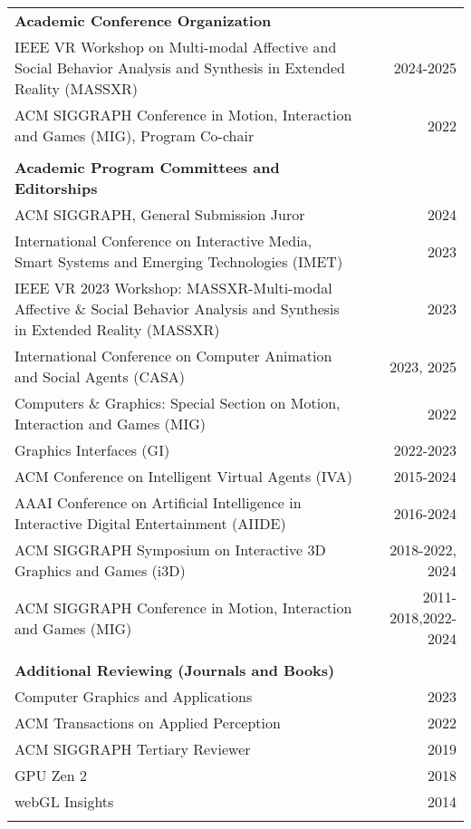 \begin{table}[h!]
\begin{tabularx}{7.1in}{@{}L@{\extracolsep\fill}r}
{\bf Academic Conference Organization } & \\
IEEE VR Workshop on Multi-modal Affective and Social Behavior Analysis and Synthesis in Extended Reality (MASSXR) & 2024-2025 \\
ACM SIGGRAPH Conference in Motion, Interaction and Games (MIG), Program Co-chair & 2022 \\
\phantom{yommomma} & \phantom{2002}\\

{\bf Academic Program Committees and Editorships} & \\
ACM SIGGRAPH, General Submission Juror & 2024\\
International Conference on Interactive Media, Smart Systems and Emerging Technologies (IMET)& 2023\\
IEEE VR 2023 Workshop: MASSXR-Multi-modal Affective \& Social Behavior Analysis and Synthesis in Extended Reality (MASSXR)& 2023\\
International Conference on Computer Animation and Social Agents (CASA)& 2023, 2025 \\
Computers \& Graphics: Special Section on Motion, Interaction and Games (MIG)& 2022 \\
Graphics Interfaces (GI)& 2022-2023 \\
ACM Conference on Intelligent Virtual Agents (IVA)& 2015-2024\\
AAAI Conference on Artificial Intelligence in Interactive Digital Entertainment (AIIDE)& 2016-2024 \\
ACM SIGGRAPH Symposium on Interactive 3D Graphics and Games (i3D)& 2018-2022, 2024 \\
ACM SIGGRAPH Conference in Motion, Interaction and Games (MIG)& 2011-2018,2022-2024 \\
\phantom{yommomma} & \phantom{2002}\\

{\bf Additional Reviewing (Journals and Books)} & \\
Computer Graphics and Applications & 2023 \\
ACM Transactions on Applied Perception & 2022 \\
ACM SIGGRAPH Tertiary Reviewer & 2019 \\
GPU Zen 2 & 2018 \\
webGL Insights & 2014 \\
\phantom{yommomma} & \phantom{2002}\\

\end{tabularx}
\end{table}


